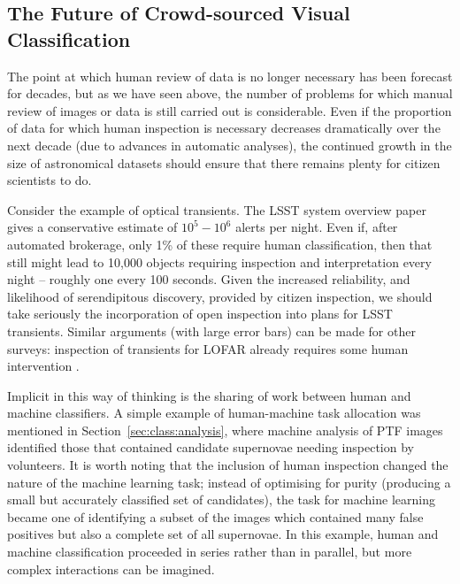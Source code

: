 \documentclass{ar2e}
\def\Sref#1{Section~\ref{#1}\xspace}
\begin{document}

% 

\subsection{The Future of Crowd-sourced Visual Classification}
\label{sec:future_csvis}

The point at which human review of data is no longer necessary has been forecast
for decades, but as we have seen above, the number of problems for which manual
review of images or data is still carried out is considerable. Even if the
proportion of data for which human inspection is necessary decreases
dramatically over the next decade (due to advances in automatic analyses), the
continued growth in the size of astronomical datasets should ensure that there
remains plenty for citizen scientists to do. 

Consider the example of optical transients. The LSST system overview paper
\citep{LSSTsystem} gives a conservative estimate of $10^5-10^6$ alerts per
night. Even if, after automated brokerage, only 1\% of these require human
classification, then that still might lead to 10,000 objects requiring
inspection and interpretation every night -- roughly one every 100 seconds.
Given the increased reliability, and likelihood of serendipitous discovery,
provided by citizen inspection, we should take seriously the incorporation of
open inspection into plans for LSST transients. Similar arguments (with large
error bars) can be made for other surveys: inspection of transients for LOFAR
already requires some human intervention \citep{LOFAR}. 


Implicit in this way of thinking is the sharing of work between human and
machine classifiers.  A simple example of human-machine task allocation was
mentioned in \Sref{sec:class:analysis}, where machine analysis of PTF images
identified those that contained candidate supernovae needing inspection by
volunteers. It is worth noting that the inclusion of human inspection changed
the nature of the machine learning task; instead of optimising for purity
(producing a small but accurately classified set of candidates), the task for
machine learning became one of identifying a subset of the images which
contained many false positives but also a complete set of all supernovae. 
In this example, human and machine classification proceeded in series rather
than in parallel, but more complex interactions can be imagined. 
\end{document}
